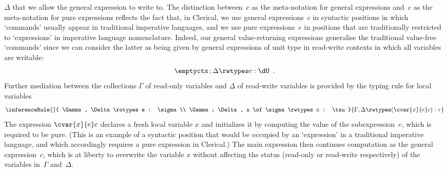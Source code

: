 $\Delta$ that we allow the general expression to write to. 
The distinction between~$c$ as the meta-notation for general expressions and~$e$ as the meta-notation for pure expressions reflects the fact that, in Clerical, we use general expressions~$c$ in syntactic positions in which `commands' usually appear in traditional imperative languages, and we use pure expressions~$e$ in positions that are traditionally restricted to  `expressions' in imperative language nomenclature. Indeed, our general value-returning expressions generalise the traditional value-free `commands' since we can consider the latter as being given by
general expressions of unit type in read-write contexts in which all variables are writable:
\[
  \emptyctx  \, ; \Delta \rwtypes c : \dU \enspace . 
\]
Further mediation between the collections $\Gamma$ of read-only variables and $\Delta$ of read-write variables is provided by the typing rule for local variables
\[
 \inferenceRule{}{
      \Gamma, \Delta \rotypes e : \sigma \\
      \Gamma ; \Delta, x \of \sigma \rwtypes c : \tau
     }{
      \Gamma ; \Delta \rwtypes (\cvar{x}{e} c) : \tau
    }
\]
The expression $\cvar{x}{e} c$ declares a fresh local variable $x$ and initializes it by computing the value of the subexpression~$e$, which is required to be pure. (This is an example of a syntactic position that would be occupied by an `expression' in a traditional imperative language, and which accordingly  requires a pure expression in Clerical.) The main expression then continues computation as the general expression~$c$, which is at liberty to overwrite the variable $x$ without affecting the status (read-only or read-write respectively) of the variables in~$\Gamma$ and~$\Delta$. 


